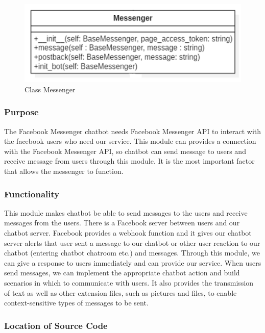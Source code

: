 \begin{figure}[htbp]
\centerline{\includegraphics[width=\linewidth]{./pictures/class_messenger}}
\caption{Class Messenger}
\label{fig:class_messenger}
\end{figure}
\FloatBarrier

\subsubsection {Purpose}

The Facebook Messenger chatbot needs Facebook Messenger API to interact with the facebook users who need our service. This module can provides a connection with the Facebook Messenger API, so chatbot can send message to users and receive message from users through this module. It is the most important factor that allows the messenger to function.  

\subsubsection {Functionality}

This module makes chatbot be able to send messages to the users and receive messages from the users. There is a Facebook server between users and our chatbot server. Facebook provides a webhook function and it gives our chatbot server alerts that user sent a message to our chatbot or other user reaction to our chatbot (entering chatbot chatroom etc.) and messages. Through this module, we can give a response to users immediately and can provide our service. When users send messages, we can implement the appropriate chatbot action and build scenarios in which to communicate with users. It also provides the transmission of text as well as other extension files, such as pictures and files, to enable context-sensitive types of messages to be sent. 

\subsubsection {Location of Source Code}

